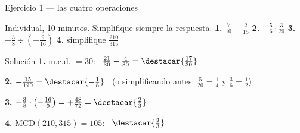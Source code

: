 \documentclass[aspectratio=169,10pt]{beamer}
\begin{document}
\begin{frame}{Ejercicio 1 — las cuatro operaciones}
  \scriptsize
  \begin{alertblock}{Individual, 10 minutos. Simplifique siempre la respuesta.}
    \tiny
    \textbf{1.} $\tfrac{7}{10}-\tfrac{2}{15}$ \qquad
    \textbf{2.} $-\tfrac{5}{6}\cdot\tfrac{3}{20}$ \qquad
    \textbf{3.} $-\tfrac{3}{8}\div\left(-\tfrac{9}{16}\right)$ \qquad
    \textbf{4.} simplifique $\tfrac{210}{315}$
  \end{alertblock}

  \vspace{0.04cm}
  \begin{block}{Solución}
    \tiny
    \textbf{1.} m.c.d. $=30$: \ $\tfrac{21}{30}-\tfrac{4}{30}
    = \destacar{\tfrac{17}{30}}$

    \vspace{0.08cm}
    \textbf{2.} $-\tfrac{15}{120} = \destacar{-\tfrac{1}{8}}$
    \ {\color{uniGris}(o simplificando antes: $\tfrac{5}{20}=\tfrac14$ y
    $\tfrac{3}{6}=\tfrac12$)}

    \vspace{0.08cm}
    \textbf{3.} $-\tfrac{3}{8}\cdot\left(-\tfrac{16}{9}\right)
    = +\tfrac{48}{72} = \destacar{\tfrac{2}{3}}$

    \vspace{0.08cm}
    \textbf{4.} $\mathrm{MCD}(210,315)=105$: \
    $\destacar{\tfrac{2}{3}}$
  \end{block}
\end{frame}
\end{document}
